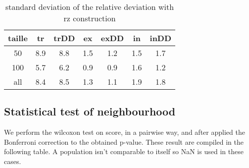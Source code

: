 \documentclass[12pt,a4paper]{article}
\begin{document}
\begin{table}[!h]
\centering
\begin{tabular}{|*{7}{c|}}
  \hline
  taille & tr & trDD & ex & exDD & in & inDD \\
  \hline
  50 & 8.9 & 8.8 & 1.5 & 1.2 & 1.5 & 1.7 \\ 
  100 & 5.7 & 6.2 & 0.9 & 0.9 & 1.6 & 1.2 \\
  all & 8.4 & 8.5 & 1.3 & 1.1 & 1.9 & 1.8 \\
  \hline
\end{tabular}
\caption{standard deviation of the relative deviation with rz construction}
\end{table}


\subsection{Statistical test of neighbourhood}

We perform the wilcoxon test on score, in a pairwise way, and after applied the Bonferroni correction to the obtained p-value. These result are compiled in the following table. A population isn't comparable to itself so NaN is used in these cases.
\end{document}
